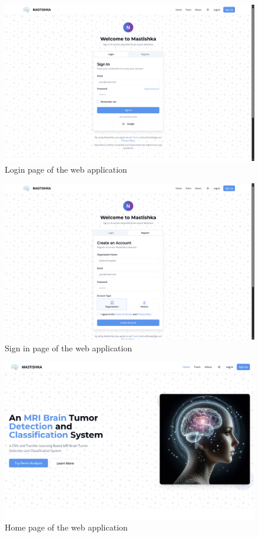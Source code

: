 \begin{figure}[H]
    \centering
    \includegraphics[width=1\linewidth]{App/login.png}
    \caption{Login page of the web application}
    \label{fig:login_page}
\end{figure}

\begin{figure}[H]
    \centering
    \includegraphics[width=1\linewidth]{App/signin.png}
    \caption{Sign in page of the web application}
    \label{fig:signin_page}
\end{figure}

\begin{figure}[H]
    \centering
    \includegraphics[width=0.8\linewidth]{App/home.png}
    \caption{Home page of the web application}
    \label{fig:home_page}
\end{figure}

